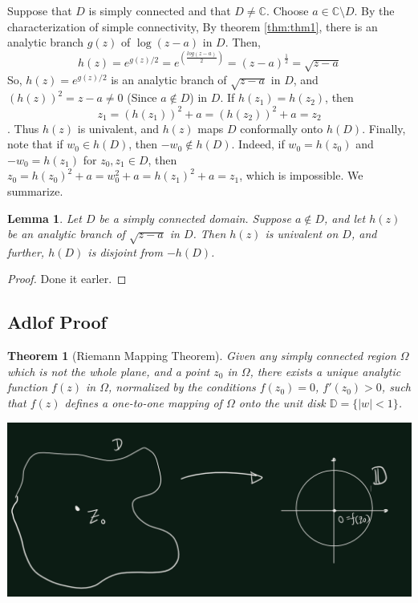 \documentclass[
]{book}
\newtheorem{theorem}{Theorem}[chapter]
\newtheorem{lemma}{Lemma}[chapter]
\theoremstyle{definition}
\theoremstyle{definition}
\theoremstyle{definition}
\theoremstyle{definition}
\theoremstyle{remark}
\begin{document}
Suppose that \(D\) is simply connected and that \(D \neq \mathbb{C}\). Choose \(a \in \mathbb{C} \setminus D\). By the characterization of simple connectivity,
By theorem \ref{thm:thm1}, there is an analytic branch \(g(z)\) of \(\log(z - a)\) in \(D\).
Then,
\[h(z) = e^{g(z)/2}=e^{\left(\frac{log(z-a)}{2}\right)}=(z-a)^{\frac{1}{2}}=\sqrt{z-a}\]
So, \(h(z) = e^{g(z)/2}\) is an analytic branch of \(\sqrt{z - a}\) in \(D\), and \((h(z))^2 = z - a \neq 0\) (Since \(a\not\in D\)) in \(D\). If \(h(z_1) = h(z_2)\), then \[z_1 = (h(z_1))^2 + a = (h(z_2))^2 + a = z_2\].
Thus \(h(z)\) is univalent, and \(h(z)\) maps \(D\) conformally onto \(h(D)\). Finally, note that if \(w_0 \in h(D)\), then \(-w_0 \notin h(D)\). Indeed, if \(w_0 = h(z_0)\) and \(-w_0 = h(z_1)\) for \(z_0, z_1 \in D\), then \(z_0 = h(z_0)^2 + a = w_0^2 + a = h(z_1)^2 + a = z_1\), which is impossible. We summarize.

\begin{lemma}
\protect\hypertarget{lem:unnamed-chunk-43}{}\label{lem:unnamed-chunk-43}Let \(D\) be a simply connected domain. Suppose \(a \notin D\), and let
\(h(z)\) be an analytic branch of \(\sqrt{z - a}\) in \(D\). Then \(h(z)\) is univalent on \(D\), and further, \(h(D)\) is disjoint from \(-h(D)\).
\end{lemma}

\begin{proof}
Done it earler.
\end{proof}

\subsection{Adlof Proof}\label{adlof-proof}

\begin{theorem}[Riemann Mapping Theorem]
\protect\hypertarget{thm:unnamed-chunk-45}{}\label{thm:unnamed-chunk-45}Given any simply connected region \(\Omega\) which is not the whole plane, and a point \(z_0\) in \(\Omega\), there exists a unique analytic function \(f(z)\) in \(\Omega\), normalized by the conditions \(f(z_0) = 0\), \(f'(z_0) > 0\), such that \(f(z)\) defines a one-to-one mapping of \(\Omega\) onto the unit disk \(\mathbb{D}=\{|w| < 1\}\).
\end{theorem}

\includegraphics[width=19.97in]{figures/Riemann_Mapping_Therom/fig4}
\end{document}
